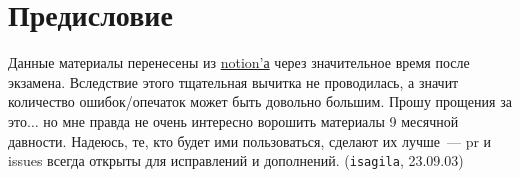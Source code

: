 \section*{Предисловие}

Данные материалы перенесены из
\href{https://awes0me.notion.site/EX-01-3fd1bc4e706c423fb69d157cfc7e0a2a?pvs=25}
{notion'а} через значительное время после экзамена. Вследствие этого тщательная
вычитка не проводилась, а значит количество ошибок/опечаток может быть довольно
большим. Прошу прощения за это\(\dotsc\) но мне правда не очень интересно
ворошить материалы 9 месячной давности. Надеюсь, те, кто будет ими пользоваться,
сделают их лучше~--- pr и issues всегда открыты для исправлений и дополнений.
(\texttt{isagila}, 23.09.03)
